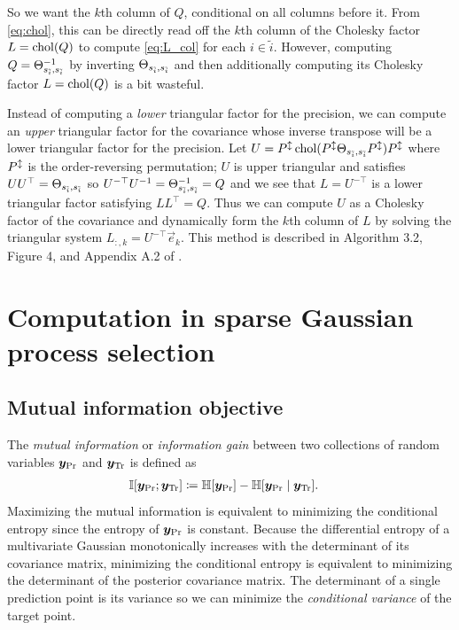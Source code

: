 \documentclass[review,supplement,onefignum,onetabnum]{siamonline220329}
\begin{document}
So we want the \( k \)th column of \( Q
\), conditional on all columns before it.
From \cref{eq:chol}, this can be directly read off the \(
k \)th column of the Cholesky factor \( L = \operatorname{chol}(Q) \) to
compute \cref{eq:L_col} for each \( i \in \tilde{i} \).
However, computing \( Q = \Theta_{s_{\tilde{i}}, s_{\tilde{i}}}^{-1} \) by
inverting \( \Theta_{s_{\tilde{i}}, s_{\tilde{i}}} \) and then additionally
computing its Cholesky factor \( L = \operatorname{chol}(Q) \) is a bit wasteful.

Instead of computing a \emph{lower} triangular factor for the precision,
we can compute an \emph{upper} triangular factor for the covariance whose
inverse transpose will be a lower triangular factor for the precision.
Let \( U = P^{\updownarrow} \operatorname{chol}(P^{\updownarrow} \Theta_{s_{\tilde{i}},
s_{\tilde{i}}} P^{\updownarrow}) P^{\updownarrow} \) where \( P^{\updownarrow} \) is the
order-reversing permutation; \( U \) is upper triangular and satisfies \( U
U^{\top} = \Theta_{s_{\tilde{i}}, s_{\tilde{i}}} \) so \( U^{-\top} U^{-1} =
\Theta_{s_{\tilde{i}}, s_{\tilde{i}}}^{-1} = Q \) and we see that \( L = U^{-\top}
\) is a lower triangular factor satisfying \( L L^{\top} = Q \).
Thus we can compute \( U \) as a Cholesky factor of the covariance
and dynamically form the \( k \)th column of \( L \) by solving
the triangular system \( L_{:, k} = U^{-\top} \vec{e}_k \).
This method is described in Algorithm 3.2, Figure
4, and Appendix A.2 of \cite{schafer2021sparse}.

\newpage

\section{Computation in sparse Gaussian process selection}

\subsection{Mutual information objective}
\label{app:mutual_info}

The \emph{mutual information} or \emph{information
gain} between two collections of random variables \(
\bm{y}_{\text{Pr}} \) and \( \bm{y}_{\text{Tr}} \) is defined as
\begin{align}
  \label{eq:info}
  \MI[\vec{y}_\Pred;\vec{y}_\Train] &\defeq \entropy[\vec{y}_\Pred] -
    \entropy[\vec{y}_\Pred \mid \vec{y}_\Train].
\end{align}
Maximizing the mutual information is equivalent to minimizing the
conditional entropy since the entropy of \( \bm{y}_{\text{Pr}} \) is constant.
Because the differential entropy of a multivariate Gaussian monotonically
increases with the determinant of its covariance matrix, minimizing the
conditional entropy is equivalent to minimizing the determinant of the
posterior covariance matrix.
The determinant of a single prediction point is its variance so we
can minimize the \emph{conditional variance} of the target point.
\end{document}

